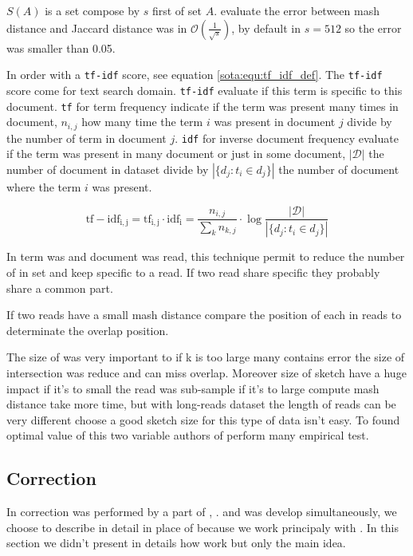 \documentclass[main]{subfiles}
\begin{document}
$S(A)$ is a \kmers set compose by $s$ first \kmers of set $A$. \citeauthor{mash_distance} evaluate the error between mash distance and Jaccard distance was in $\mathcal{O}(\frac{1}{\sqrt{s}})$, by default in \mhap $s=512$ so the error was smaller than 0.05.

In \mhap order \kmer with a \texttt{tf-idf} score, see equation \ref{sota:equ:tf_idf_def}. The \texttt{tf-idf} score come for text search domain. \texttt{tf-idf} evaluate if this term is specific to this document. \texttt{tf} for term frequency indicate if the term was present many times in document, $n_{i,j}$ how many time the term $i$ was present in document $j$ divide by the number of term in document $j$. \texttt{idf} for inverse document frequency evaluate if the term was present in many document or just in some document, $|\mathcal{D}|$ the number of document in dataset divide by $|\{d_{j}:t_{i}\in d_{j}\}|$ the number of document where the term $i$ was present.

\begin{equation}
\mathrm{tf-idf_{i,j}} = \mathrm{tf_{i,j}} \cdot \mathrm{idf_{i}} = \frac{n_{i,j}}{\sum_{k}n_{k,j}} \cdot \log{\frac  {|\mathcal{D}|}{|\{d_{j}:t_{i}\in d_{j}\}|}}
\label{sota:equ:tf_idf_def}
\end{equation}

In \mhap term was \kmer and document was read, this technique permit to reduce the number of \kmer in set and keep \kmer specific to a read. If two read share specific \kmer they probably share a common part.

If two reads have a small mash distance \mhap compare the position of each \kmer in reads to determinate the overlap position.

The size of \kmer was very important to if k is too large many \kmer contains error the size of intersection was reduce and \mhap can miss overlap. Moreover size of sketch have a huge impact if it's to small the read was sub-sample if it's to large compute mash distance take more time, but with long-reads dataset the length of reads can be very different choose a good sketch size for this type of data isn't easy. To found optimal value of this two variable authors of \mhap perform many empirical test.

\subsection{Correction}

In \canu correction was performed by a part of  \cite{falcon}, .  and \canu was develop simultaneously, we choose to describe \canu in detail in place of  because we work principaly with \canu. In this section we didn't present in details how  work but only the main idea.
\end{document}
